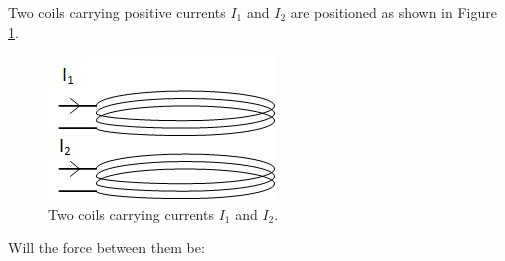 \documentclass{ximera}
\begin{document}
\begin{question}
Two coils  carrying positive currents $I_1$ and $I_2$ are positioned as shown in Figure \ref{fig:CoupledCoils}.

\begin{figure}[htbp]
\begin{center}
\includegraphics[scale=1]{../jpg/coupledCoils.jpg}
\end{center}
\caption{Two coils carrying currents $I_1$ and $I_2$. }
\label{fig:CoupledCoils}
\end{figure}

 Will the force between them be:
 
 \begin{multipleChoice}  
\end{multipleChoice} 

\end{question}
\end{document}
